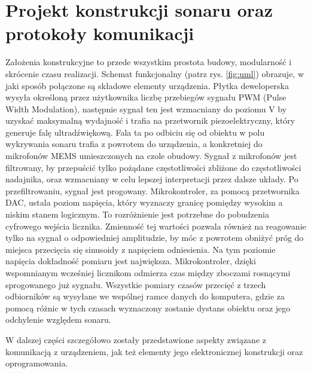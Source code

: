\chapter[Projekt konstrukcji sonaru oraz protokoły komunikacji]{Projekt konstrukcji sonaru oraz protokoły komunikacji}

\label{chapter:konstrukcja}


Założenia konstrukcyjne to przede wszystkim prostota budowy, modularność i skrócenie czasu realizacji. 
Schemat funkcjonalny (patrz rys. \ref{fig:uml}) obrazuje, w jaki sposób połączone są składowe elementy urządzenia.
Płytka deweloperska wysyła określoną przez użytkownika liczbę przebiegów sygnału PWM (Pulse Width Modulation), 
następnie sygnał ten jest wzmacniany do poziomu \unit[80]{V} by uzyskać maksymalną wydajność i trafia na przetwornik piezoelektryczny, 
który generuje falę ultradźwiękową. Fala ta po odbiciu się od obiektu w polu wykrywania sonaru trafia z powrotem do urządzenia, 
a konkretniej do mikrofonów MEMS umieszczonych na czole obudowy.
Sygnał z mikrofonów jest filtrowany, by przepuścić tylko pożądane częstotliwości zbliżone do częstotliwości nadajnika, 
oraz wzmacniany w celu lepszej interpretacji przez dalsze układy.
Po przefiltrowaniu, sygnał jest progowany. Mikrokontroler, za pomocą przetwornika DAC, ustala poziom napięcia, 
który wyznaczy granicę pomiędzy wysokim a niskim stanem logicznym. To rozróżnienie jest potrzebne do pobudzenia cyfrowego wejścia licznika.
Zmienność tej wartości pozwala również na reagowanie tylko na sygnał o odpowiedniej amplitudzie, by móc z powrotem obniżyć próg 
do miejsca przecięcia się sinusoidy z napięciem odniesienia. Na tym poziomie napięcia dokładność pomiaru jest największa.
Mikrokontroler, dzięki wspomnianym wcześniej licznikom odmierza czas między zboczami rosnącymi sprogowanego już sygnału.
Wszystkie pomiary czasów przecięć z trzech odbiorników są wysyłane we wspólnej ramce danych do komputera, gdzie za pomocą 
różnic w tych czasach wyznaczony zostanie dystans obiektu oraz jego odchylenie względem sonaru.

W dalszej części szczegółowo zostały przedstawione aspekty związane
z komunikacją z urządzeniem, jak też elementy jego elektronicznej
konstrukcji oraz oprogramowania.

